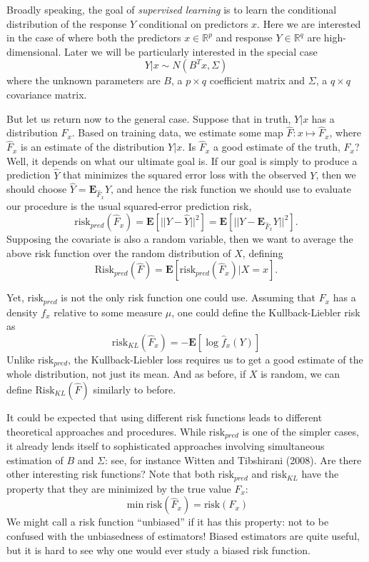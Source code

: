 \documentclass[12pt]{article}
\begin{document}
\maketitle

\newcommand{\tr}{\text{tr}}
\newcommand{\E}{\textbf{E}}
\newcommand{\diag}{\text{diag}}
\newcommand{\argmax}{\text{argmax}}
\newcommand{\Cov}{\text{Cov}}
\newcommand{\Var}{\text{Var}}
\newcommand{\argmin}{\text{argmin}}
\newcommand{\Vol}{\text{Vol}}
\newcommand{\comm}[1]{}

Broadly speaking, the goal of \emph{supervised learning} is to learn
the conditional distribution of the response $Y$ conditional on
predictors $x$.  Here we are interested in the case of where both the
predictors $x \in \mathbb{R}^p$ and response $Y \in \mathbb{R}^q$ are
high-dimensional.  Later we will be particularly interested in the
special case
$$
Y|x \sim N(B^T x, \Sigma)
$$
where the unknown parameters are $B$, a $p \times q$ coefficient
matrix and $\Sigma$, a $q \times q$ covariance matrix.

But let us return now to the general case.  Suppose that in truth,
$Y|x$ has a distribution $F_x$.  Based on training data, we estimate
some map $\hat{F}: x \mapsto \hat{F}_x$, where $\hat{F}_x$ is an
estimate of the distribution $Y|x$.  Is $\hat{F}_x$ a good estimate of
the truth, $F_x$? Well, it depends on what our ultimate goal is.  If
our goal is simply to produce a prediction $\hat{Y}$ that minimizes
the squared error loss with the observed $Y$, then we should choose
$\hat{Y} = \E_{\hat{F}_x} Y$, and hence the risk function we should
use to evaluate our procedure is the usual squared-error prediction
risk,
\[
\text{risk}_{pred}(\hat{F}_x) = \E[||Y - \hat{Y}||^2] = \E[||Y - \E_{\hat{F}_x} Y||^2].
\]
Supposing the covariate is also a random variable, then we want to
average the above risk function over the random distribution of $X$,
defining
\[
\text{Risk}_{pred}(\hat{F}) = \E[\text{risk}_{pred}(\hat{F}_x)|X = x].
\]

Yet, $\text{risk}_{pred}$ is not the only risk function one could use.
Assuming that $F_x$ has a density $f_x$ relative to some measure $\mu$, one
could define the Kullback-Liebler risk as
\[
\text{risk}_{KL}(\hat{F}_x) = -\E[\log \hat{f}_x(Y)]
\]
Unlike $\text{risk}_{pred}$, the Kullback-Liebler loss requires us to
get a good estimate of the whole distribution, not just its mean.  And
as before, if $X$ is random, we can define
$\text{Risk}_{KL}(\hat{F})$ similarly to before.

It could be expected that using different risk functions leads to
different theoretical approaches and procedures.  While
$\text{risk}_{pred}$ is one of the simpler cases, it already lends
itself to sophisticated approaches involving simultaneous estimation
of $B$ and $\Sigma$: see, for instance Witten and Tibshirani (2008).
Are there other interesting risk functions?  Note that both
$\text{risk}_{pred}$ and $\text{risk}_{KL}$ have the property that
they are minimized by the true value $F_x$:
\[
\min \text{risk}(\hat{F}_x) = \text{risk}(F_x)
\]
We might call a risk function ``unbiased'' if it has this property:
not to be confused with the unbiasedness of estimators!  Biased
estimators are quite useful, but it is hard to see why one would ever
study a biased risk function.
\end{document}

